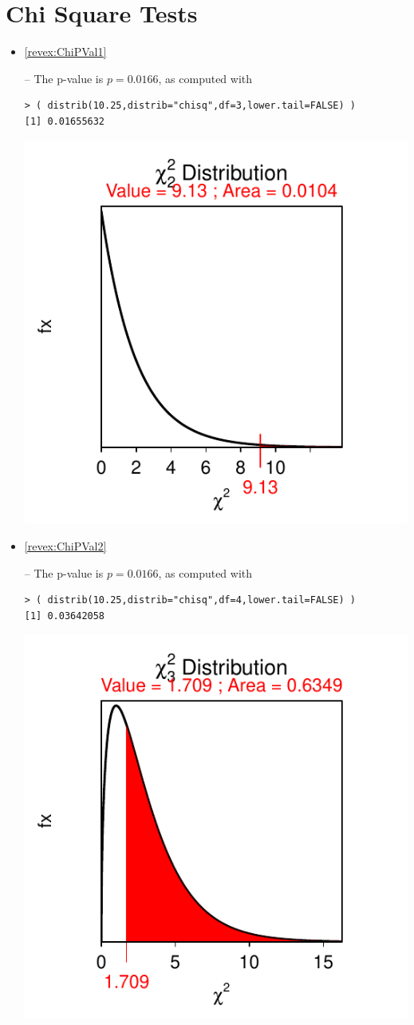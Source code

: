 \documentclass[10pt,openany]{book}\usepackage[]{graphicx}\usepackage[]{color}
\makeatletter
\newenvironment{kframe}{%
 \def\at@end@of@kframe{}%
 \ifinner\ifhmode%
  \def\at@end@of@kframe{\end{minipage}}%
  \begin{minipage}{\columnwidth}%
 \fi\fi%
 \def\FrameCommand##1{\hskip\@totalleftmargin \hskip-\fboxsep
 \colorbox{shadecolor}{##1}\hskip-\fboxsep
     \hskip-\linewidth \hskip-\@totalleftmargin \hskip\columnwidth}%
 \MakeFramed {\advance\hsize-\width
   \@totalleftmargin\z@ \linewidth\hsize
   \@setminipage}}%
 {\par\unskip\endMakeFramed%
 \at@end@of@kframe}
\newenvironment{knitrout}{}{} %
\makeatother
\begin{document}
\section*{Chi Square Tests}
\begin{itemize}
  \item \hypertarget{ans:ChiPVal1}{\ref{revex:ChiPVal1}} -- The p-value is $p=0.0166$, as computed with
\begin{knitrout}
\color{fgcolor}\begin{kframe}
\begin{verbatim}
> ( distrib(10.25,distrib="chisq",df=3,lower.tail=FALSE) )
[1] 0.01655632
\end{verbatim}
\end{kframe}

{\centering \includegraphics[width=.4\linewidth]{Figs/unnamed-chunk-401-1} 

}



\end{knitrout}
  \item \hypertarget{ans:ChiPVal2}{\ref{revex:ChiPVal2}} -- The p-value is $p=0.0166$, as computed with
\begin{knitrout}
\color{fgcolor}\begin{kframe}
\begin{verbatim}
> ( distrib(10.25,distrib="chisq",df=4,lower.tail=FALSE) )
[1] 0.03642058
\end{verbatim}
\end{kframe}

{\centering \includegraphics[width=.4\linewidth]{Figs/unnamed-chunk-402-1} 

}
\end{knitrout}
\end{itemize}
\end{document}
